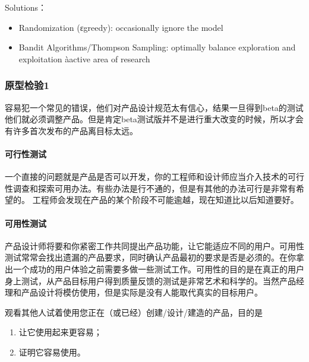 \documentclass[letterpaper,10pt,english]{sphinxmanual}
\begin{document}
Solutions：
\begin{itemize}
\item {} 
Randomization (ε\sphinxhyphen{}greedy): occasionally ignore the model

\item {} 
Bandit Algorithms/Thompson Sampling: optimally balance exploration
and exploitation àactive area of research

\end{itemize}


\subsubsection{原型检验1\sphinxfootnotemark[808]}
\label{\detokenize{chapter_project/inspect:id1}}\label{\detokenize{chapter_project/inspect::doc}}%
\begin{footnotetext}[808]\sphinxAtStartFootnote
{}
%
\end{footnotetext}\ignorespaces 
容易犯一个常见的错误，他们对产品设计规范太有信心，结果一旦得到beta的测试他们就必须调整产品。但是肯定beta测试版并不是进行重大改变的时候，所以才会有许多首次发布的产品离目标太远。


\paragraph{可行性测试}
\label{\detokenize{chapter_project/inspect:id2}}
一个直接的问题就是产品是否可以开发，你的工程师和设计师应当介入技术的可行性调查和探索可用办法。有些办法是行不通的，但是有其他的办法可行是非常有希望的。
工程师会发现在产品的某个阶段不可能逾越，现在知道比以后知道要好。


\paragraph{可用性测试}
\label{\detokenize{chapter_project/inspect:id3}}
产品设计师将要和你紧密工作共同提出产品功能，让它能适应不同的用户。可用性测试常常会找出遗漏的产品要求，同时确认产品最初的要求是否是必须的。在你拿出一个成功的用户体验之前需要多做一些测试工作。可用性的目的是在真正的用户身上测试，从产品目标用户得到质量反馈的测试是非常艺术和科学的。当然产品经理和产品设计将模仿使用，但是实际是没有人能取代真实的目标用户。

观看其他人试着使用您正在（或已经）创建/设计/建造的产品，目的是
%
\begin{footnote}[809]\sphinxAtStartFootnote
{}
%
\end{footnote}
\begin{enumerate}
%
\item {} 
让它使用起来更容易；

\item {} 
证明它容易使用。

\end{enumerate}
\end{document}
